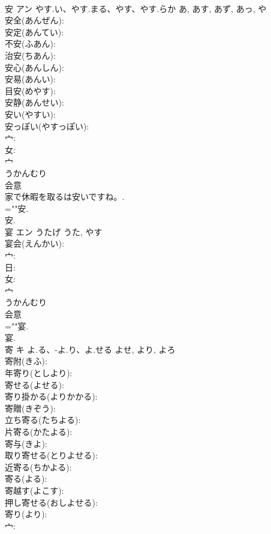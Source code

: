 \documentclass[8pt]{extreport}
\begin{document}
\begin{CJK}{UTF8}{min}
\\	安	アン	やす.い、やす.まる、やす、やす.らか	あ, あす, あず, あっ, や	
\\	安全(あんぜん): 
\\	安定(あんてい): 
\\	不安(ふあん): 
\\	治安(ちあん): 
\\	安心(あんしん): 
\\	安易(あんい): 
\\	目安(めやす): 
\\	安静(あんせい): 
\\	安い(やすい): 
\\	安っぽい(やすっぽい): 
\\	宀: 
\\	女: 
\\	宀	
\\	うかんむり	
\\	会意 
\\	家で休暇を取るは安いですね。.	
\\	=""安.
\\	安.
\\	宴	エン	うたげ	うた, やす	
\\	宴会(えんかい): 
\\	宀: 
\\	日: 
\\	女: 
\\	宀	
\\	うかんむり	
\\	会意 
\\	=""宴.
\\	宴.
\\	寄	キ	よ.る、-よ.り、よ.せる	よせ, より, よろ	
\\	寄附(きふ): 
\\	年寄り(としより): 
\\	寄せる(よせる): 
\\	寄り掛かる(よりかかる): 
\\	寄贈(きぞう): 
\\	立ち寄る(たちよる): 
\\	片寄る(かたよる): 
\\	寄与(きよ): 
\\	取り寄せる(とりよせる): 
\\	近寄る(ちかよる): 
\\	寄る(よる): 
\\	寄越す(よこす): 
\\	押し寄せる(おしよせる): 
\\	寄り(より): 
\\	宀: 

\end{CJK}
\end{document}
